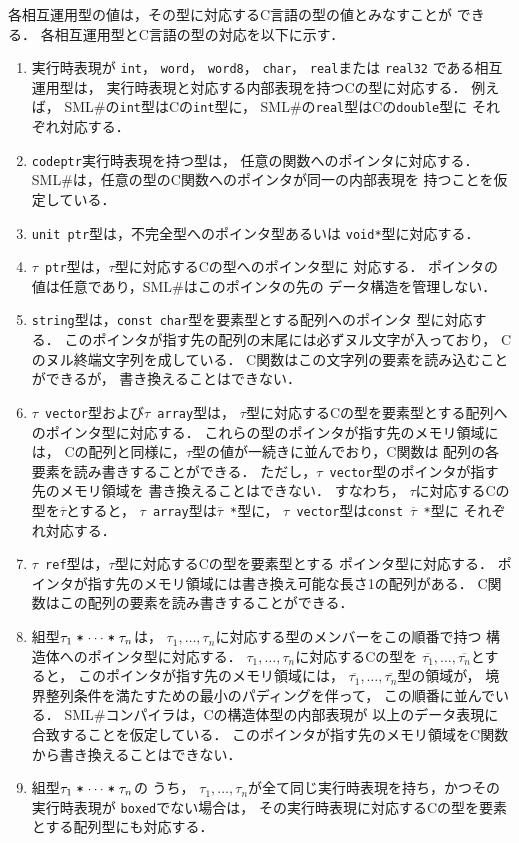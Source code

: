 \documentclass{jbook}
\newcommand{\smlsharp}{SML\#}
\begin{document}
	各相互運用型の値は，その型に対応するC言語の型の値とみなすことが
できる．
	各相互運用型とC言語の型の対応を以下に示す．
\begin{enumerate}
\item
	実行時表現が
{\tt int}，
{\tt word}，
{\tt word8}，
{\tt char}，
{\tt real}または
{\tt real32}
である相互運用型は，
実行時表現と対応する内部表現を持つCの型に対応する．
	例えば，
\smlsharp{}の{\tt int}型はCの{\tt int}型に，
\smlsharp{}の{\tt real}型はCの{\tt double}型に
それぞれ対応する．
\item
	{\tt codeptr}実行時表現を持つ型は，
任意の関数へのポインタに対応する．
	\smlsharp{}は，任意の型のC関数へのポインタが同一の内部表現を
持つことを仮定している．
\item
	{\tt unit ptr}型は，不完全型へのポインタ型あるいは
{\tt void*}型に対応する．
\item
	{\tt $\tau$ ptr}型は，$\tau$型に対応するCの型へのポインタ型に
対応する．
	ポインタの値は任意であり，\smlsharp{}はこのポインタの先の
データ構造を管理しない．
\item
	{\tt string}型は，{\tt const char}型を要素型とする配列へのポインタ
型に対応する．
	このポインタが指す先の配列の末尾には必ずヌル文字が入っており，
Cのヌル終端文字列を成している．
	C関数はこの文字列の要素を読み込むことができるが，
書き換えることはできない．
\item
	{\tt $\tau$ vector}型および{\tt $\tau$ array}型は，
$\tau$型に対応するCの型を要素型とする配列へのポインタ型に対応する．
	これらの型のポインタが指す先のメモリ領域には，
Cの配列と同様に，$\tau$型の値が一続きに並んでおり，C関数は
配列の各要素を読み書きすることができる．
	ただし，{\tt $\tau$ vector}型のポインタが指す先のメモリ領域を
書き換えることはできない．
	すなわち，
$\tau$に対応するCの型を$\overline{\tau}$とすると，
{\tt $\tau$ array}型は{\tt $\overline{\tau}$ *}型に，
{\tt $\tau$ vector}型は{\tt const $\overline{\tau}$ *}型に
それぞれ対応する．
\item
	{\tt $\tau$ ref}型は，$\tau$型に対応するCの型を要素型とする
ポインタ型に対応する．
	ポインタが指す先のメモリ領域には書き換え可能な長さ1の配列がある．
	C関数はこの配列の要素を読み書きすることができる．
\item
	組型$\tau_1\mathrel{\mbox{\tt *}}\cdots\mathrel{\mbox{\tt *}}\tau_n$は，
$\tau_1,\ldots,\tau_n$に対応する型のメンバーをこの順番で持つ
構造体へのポインタ型に対応する．
	$\tau_1,\ldots,\tau_n$に対応するCの型を
$\overline{\tau_1},\ldots,\overline{\tau_n}$とすると，
このポインタが指す先のメモリ領域には，
$\overline{\tau_1},\ldots,\overline{\tau_n}$型の領域が，
境界整列条件を満たすための最小のパディングを伴って，
この順番に並んでいる．
	\smlsharp{}コンパイラは，Cの構造体型の内部表現が
以上のデータ表現に合致することを仮定している．
	このポインタが指す先のメモリ領域をC関数から書き換えることはできない．
\item
	組型$\tau_1\mathrel{\mbox{\tt *}}\cdots\mathrel{\mbox{\tt *}}\tau_n$の
うち，
$\tau_1,\ldots,\tau_n$が全て同じ実行時表現を持ち，かつその実行時表現が
{\tt boxed}でない場合は，
その実行時表現に対応するCの型を要素とする配列型にも対応する．
\end{enumerate}
\end{document}
